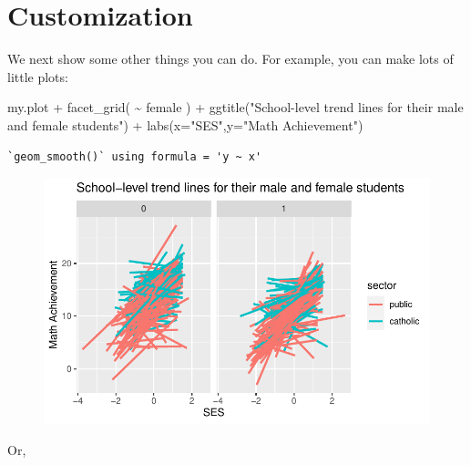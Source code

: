 \documentclass[
  letterpaper,
  DIV=11,
  numbers=noendperiod]{scrreprt}
\newenvironment{Shaded}{\begin{snugshade}}{\end{snugshade}}
\newcommand{\AttributeTok}[1]{\textcolor[rgb]{0.49,0.56,0.16}{#1}}
\newcommand{\FunctionTok}[1]{\textcolor[rgb]{0.02,0.16,0.49}{#1}}
\newcommand{\NormalTok}[1]{\textcolor[rgb]{0.00,0.44,0.13}{#1}}
\newcommand{\SpecialCharTok}[1]{\textcolor[rgb]{0.25,0.44,0.63}{#1}}
\newcommand{\StringTok}[1]{\textcolor[rgb]{0.25,0.44,0.63}{#1}}
\begin{document}
\hypertarget{customization}{%
\section{Customization}\label{customization}}

We next show some other things you can do. For example, you can make
lots of little plots:

\begin{Shaded}
\begin{Highlighting}[]
\NormalTok{my.plot }\SpecialCharTok{+} 
  \FunctionTok{facet\_grid}\NormalTok{( }\SpecialCharTok{\textasciitilde{}}\NormalTok{ female ) }\SpecialCharTok{+} 
    \FunctionTok{ggtitle}\NormalTok{(}\StringTok{"School{-}level trend lines for their male and female students"}\NormalTok{) }\SpecialCharTok{+}
    \FunctionTok{labs}\NormalTok{(}\AttributeTok{x=}\StringTok{"SES"}\NormalTok{,}\AttributeTok{y=}\StringTok{"Math Achievement"}\NormalTok{) }
\end{Highlighting}
\end{Shaded}

\begin{verbatim}
`geom_smooth()` using formula = 'y ~ x'
\end{verbatim}

\begin{figure}[H]

{\centering \includegraphics{intro_ggplot_files/figure-pdf/unnamed-chunk-7-1.pdf}

}

\end{figure}

Or,
\end{document}
